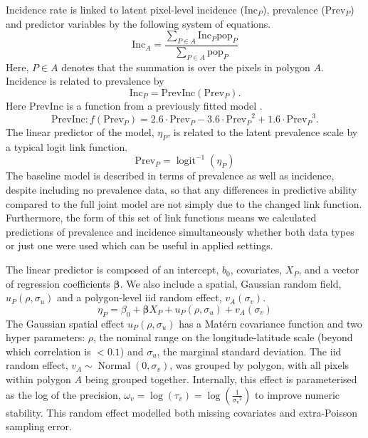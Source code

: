 \documentclass{statsoc}
\begin{document}
Incidence rate is linked to latent pixel-level incidence ($\mathrm{Inc}_P$), prevalence ($\mathrm{Prev}_P$) and predictor variables by the following system of equations.
$$\mathrm{Inc}_A = \frac{ \sum_{P \in A}\mathrm{Inc}_P \mathrm{pop}_P}{\sum_{P \in A}\mathrm{pop}_P} $$
Here, $P \in A$ denotes that the summation is over the pixels in polygon $A$. 
Incidence is related to prevalence by
$$\mathrm{Inc}_P = \mathrm{PrevInc}(\mathrm{Prev}_P).$$
Here $\mathrm{PrevInc}$ is a function from a previously fitted model \citep{cameron2015defining}. 
$$\mathrm{PrevInc}: f\left(\mathrm{Prev}_P\right) = 2.6\cdot\mathrm{Prev}_P - 3.6\cdot{\mathrm{Prev}_P}^2 + 1.6\cdot{\mathrm{Prev}_P}^3.$$
The linear predictor of the model, $\eta_P$, is related to the latent prevalence scale by a typical logit link function.
$$\mathrm{Prev}_P = \operatorname{logit}^{-1}(\eta_P)$$
The baseline model is described in terms of prevalence as well as incidence, despite including no prevalence data, so that any differences in predictive ability compared to the full joint model are not simply due to the changed link function.
Furthermore, the form of this set of link functions means we calculated predictions of prevalence and incidence simultaneously whether both data types or just one were used which can be useful in applied settings.


The linear predictor is composed of an intercept, $b_0$, covariates, $X_P$, and a vector of regression coefficients $\boldsymbol\beta$.
We also include a spatial, Gaussian random field, $u_P(\rho, \sigma_u)$ and a polygon-level iid random effect, $ v_A(\sigma_v)$.
$$\eta_P = \beta_0 + \boldsymbol\beta X_P  + u_P(\rho, \sigma_u) + v_A(\sigma_v) $$
The Gaussian spatial effect $u_P(\rho, \sigma_u)$ has a Mat\'ern covariance function and two hyper parameters: $\rho$, the nominal range on the longitude-latitude scale (beyond which correlation is $< 0.1$) and $\sigma_u$, the marginal standard deviation.
The iid random effect, $v_A \sim \operatorname{Normal}(0, \sigma_v)$,  was grouped by polygon, with all pixels within polygon $A$ being grouped together.
Internally, this effect is parameterised as the log of the precision, $\omega_v = \log(\tau_v) = \log(\frac{1}{{\sigma_v}^2})$ to improve numeric stability.
This random effect modelled both missing covariates and extra-Poisson sampling error.
\end{document}
